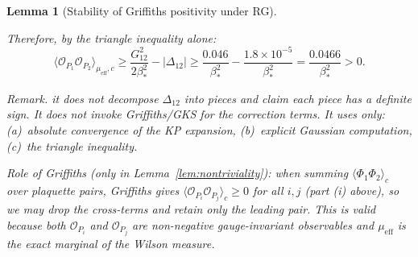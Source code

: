 \documentclass[11pt]{article}
\newtheorem{lemma}[theorem]{Lemma}
\theoremstyle{definition}
\begin{document}
\begin{lemma}[Stability of Griffiths positivity under RG]
\begin{enumerate}[nosep,label=\textup{(\roman*)}]
Therefore, by the triangle inequality alone:
\begin{equation}
\langle\mathcal{O}_{P_1}\mathcal{O}_{P_2}
\rangle_{\mu_{\mathrm{eff}},c}
\ge\frac{G_{12}^2}{2\beta_*^2}-|\Delta_{12}|
\ge\frac{0.046}{\beta_*^2}
-\frac{1.8\times 10^{-5}}{\beta_*^2}
=\frac{0.0466}{\beta_*^2}>0.
\end{equation}

\emph{Remark.}
it does not decompose $\Delta_{12}$ into pieces and
claim each piece has a definite sign.
It does not invoke Griffiths/GKS for the correction terms.
It uses only: \textup{(a)}~absolute convergence of the
KP expansion, \textup{(b)}~explicit Gaussian computation,
\textup{(c)}~the triangle inequality.

\emph{Role of Griffiths} \textup{(}only in
Lemma~\ref{lem:nontriviality}\textup{)}:
when summing $\langle\Phi_1\Phi_2\rangle_c$ over
plaquette pairs, Griffiths gives
$\langle\mathcal{O}_{P_i}\mathcal{O}_{P_j}\rangle_c\ge 0$
for all $i,j$ \textup{(}part (i) above\textup{)},
so we may drop the cross-terms and retain only the
leading pair.  This is valid because both
$\mathcal{O}_{P_i}$ and $\mathcal{O}_{P_j}$ are
non-negative gauge-invariant observables and
$\mu_{\mathrm{eff}}$ is the exact marginal of the
Wilson measure.
\end{enumerate}
\end{lemma}
\end{document}
